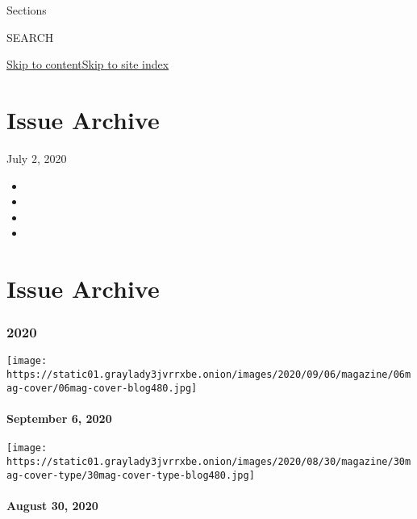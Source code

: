 Sections

SEARCH

\protect\hyperlink{site-content}{Skip to
content}\protect\hyperlink{site-index}{Skip to site index}

\hypertarget{issue-archive}{%
\section{Issue Archive}\label{issue-archive}}

July 2, 2020

\begin{itemize}
\item
\item
\item
\item
\end{itemize}

\hypertarget{issue-archive-1}{%
\section{Issue Archive}\label{issue-archive-1}}

\hypertarget{2020}{%
\subsubsection{2020}\label{2020}}

\href{https://www.nytimes3xbfgragh.onion/issue/magazine/2020/09/04/the-9620-issue}{}

\texttt{[image: https://static01.graylady3jvrrxbe.onion/images/2020/09/06/magazine/06mag-cover/06mag-cover-blog480.jpg]}

\hypertarget{september-6-2020}{%
\paragraph{September 6, 2020}\label{september-6-2020}}

\href{https://www.nytimes3xbfgragh.onion/issue/magazine/2020/08/28/the-83020-issue}{}

\texttt{[image: https://static01.graylady3jvrrxbe.onion/images/2020/08/30/magazine/30mag-cover-type/30mag-cover-type-blog480.jpg]}

\hypertarget{august-30-2020}{%
\paragraph{August 30, 2020}\label{august-30-2020}}

